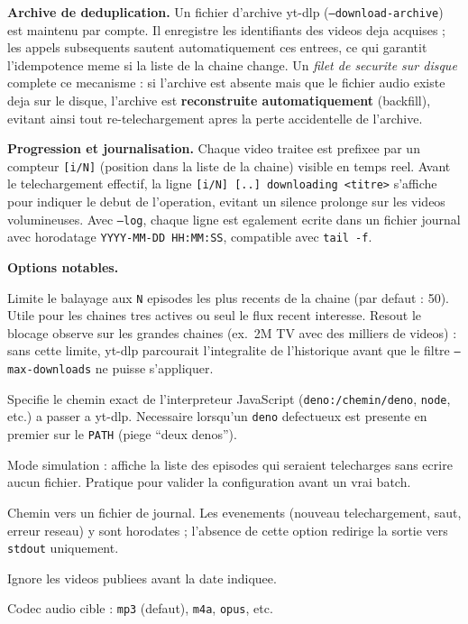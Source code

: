 \documentclass[11pt, a4paper]{article}
\begin{document}
\textbf{Archive de deduplication.} Un fichier d'archive yt-dlp (\texttt{--download-archive})
est maintenu par compte. Il enregistre les identifiants des videos deja acquises ; les
appels subsequents sautent automatiquement ces entrees, ce qui garantit l'idempotence
meme si la liste de la chaine change. Un \emph{filet de securite sur disque} complete
ce mecanisme : si l'archive est absente mais que le fichier audio existe deja sur le
disque, l'archive est \textbf{reconstruite automatiquement} (backfill), evitant ainsi
tout re-telechargement apres la perte accidentelle de l'archive.

\textbf{Progression et journalisation.} Chaque video traitee est prefixee par un
compteur \texttt{[i/N]} (position dans la liste de la chaine) visible en temps reel.
Avant le telechargement effectif, la ligne \texttt{[i/N] [..] downloading <titre>}
s'affiche pour indiquer le debut de l'operation, evitant un silence prolonge sur les
videos volumineuses. Avec \texttt{--log}, chaque ligne est egalement ecrite dans un
fichier journal avec horodatage \texttt{YYYY-MM-DD HH:MM:SS}, compatible avec
\texttt{tail -f}.

\textbf{Options notables.}
\begin{description}[style=nextline, leftmargin=2.2em, labelindent=0.4em]
  \item[\texttt{--scan-limit N}]
    Limite le balayage aux \texttt{N} episodes les plus recents de la chaine (par defaut :
    50). Utile pour les chaines tres actives ou seul le flux recent interesse. Resout
    le blocage observe sur les grandes chaines (ex.~2M TV avec des milliers de videos) :
    sans cette limite, yt-dlp parcourait l'integralite de l'historique avant que le
    filtre \texttt{--max-downloads} ne puisse s'appliquer.
  \item[\texttt{--js-runtimes}]
    Specifie le chemin exact de l'interpreteur JavaScript (\texttt{deno:/chemin/deno},
    \texttt{node}, etc.) a passer a yt-dlp. Necessaire lorsqu'un \texttt{deno} defectueux
    est presente en premier sur le \texttt{PATH} (piege ``deux denos'').
  \item[\texttt{--dry-run}]
    Mode simulation : affiche la liste des episodes qui seraient telecharges sans ecrire
    aucun fichier. Pratique pour valider la configuration avant un vrai batch.
  \item[\texttt{--log}]
    Chemin vers un fichier de journal. Les evenements (nouveau telechargement, saut,
    erreur reseau) y sont horodates ; l'absence de cette option redirige la sortie vers
    \texttt{stdout} uniquement.
  \item[\texttt{--since YYYYMMDD}]
    Ignore les videos publiees avant la date indiquee.
  \item[\texttt{--audio-format}]
    Codec audio cible : \texttt{mp3} (defaut), \texttt{m4a}, \texttt{opus}, etc.
\end{description}
\end{document}
